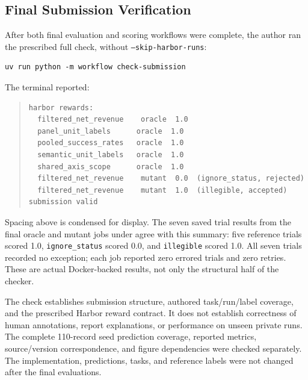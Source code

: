 \documentclass[11pt]{article}
\begin{document}
\subsection{Final Submission Verification}
\label{sec:final-submission-verification}

After both final evaluation and scoring workflows were complete, the
author ran the prescribed full check, without \texttt{--skip-harbor-runs}:
\begin{verbatim}
uv run python -m workflow check-submission
\end{verbatim}
The terminal reported:
\begin{quote}
\small
\begin{verbatim}
harbor rewards:
  filtered_net_revenue    oracle  1.0
  panel_unit_labels      oracle  1.0
  pooled_success_rates   oracle  1.0
  semantic_unit_labels   oracle  1.0
  shared_axis_scope      oracle  1.0
  filtered_net_revenue    mutant  0.0  (ignore_status, rejected)
  filtered_net_revenue    mutant  1.0  (illegible, accepted)
submission valid
\end{verbatim}
\end{quote}
Spacing above is condensed for display. The seven saved trial results
from the final oracle and mutant jobs under 
agree with this summary: five reference trials scored 1.0,
\texttt{ignore\_status} scored 0.0, and \texttt{illegible} scored 1.0.
All seven trials recorded no exception; each job reported zero errored
trials and zero retries. These are actual Docker-backed results, not
only the structural half of the checker.

The check establishes submission structure, authored task/run/label
coverage, and the prescribed Harbor reward contract. It does not establish
correctness of human annotations, report explanations, or performance
on unseen private runs. The complete 110-record seed prediction coverage,
reported metrics, source/version correspondence, and figure dependencies
were checked separately. The implementation, predictions, tasks, and
reference labels were not changed after the final evaluations.
\end{document}

